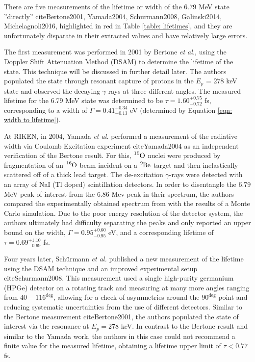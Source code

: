 There are five measurements of the lifetime or width of the 6.79 MeV state ''directly'' cite{Bertone2001, Yamada2004, Schurmann2008, Galinski2014, Michelagnoli2016}, highlighted in red in Table \ref{table: lifetimes}, and they are unfortunately disparate in their extracted values and have relatively large errors. 

The first measurement was performed in 2001 by Bertone \textit{et al.}, using the Doppler Shift Attenuation Method (DSAM) to determine the lifetime of the state. This technique will be discussed in further detail later. The authors populated the state through resonant capture of protons in the $E_{p}$ = 278 keV state and observed the decaying $\gamma$-rays at three different angles. The measured lifetime for the 6.79 MeV state was determined to be $\tau = 1.60^{+0.75}_{-0.72}$ fs, corresponding to a width of $\Gamma = 0.41^{+0.34}_{-0.13}$ eV (determined by Equation \ref{eqn: width to lifetime}). 

At RIKEN, in 2004, Yamada \textit{et al.} performed a measurement of the radiative width via Coulomb Excitation experiment cite{Yamada2004} as an independent verification of the Bertone result. For this, $\ce{^{15}O}$ nuclei were produced by fragmentation of an $\ce{^{16}O}$ beam incident on a $\ce{^{9}Be}$ target and then inelastically scattered off of a thick lead target. The de-excitation $\gamma$-rays were detected with an array of NaI (Tl doped) scintillation detectors. In order to disentangle the 6.79 MeV peak of interest from the 6.86 Mev peak in their spectrum, the authors compared the experimentally obtained spectrum from with the results of a Monte Carlo simulation. Due to the poor energy resolution of the detector system, the authors ultimately had difficulty separating the peaks and only reported an upper bound on the width, $\Gamma = 0.95^{+0.60}_{-0.95}$ eV, and a corresponding lifetime of $\tau = 0.69 ^{+1.10}_{-0.69}$ fs. 

Four years later, Sch{\"u}rmann \textit{et al.} published a new measurement of the lifetime using the DSAM technique and an improved experimental setup cite{Schurmann2008}. This measurement used a single high-purity germanium (HPGe) detector on a rotating track and measuring at many more angles ranging from $40 - 116^{\deg}$, allowing for a check of asymmetries around the $90^{\deg}$ point and reducing systematic uncertainties from the use of different detectors. Similar to the Bertone measurement cite{Bertone2001}, the authors populated the state of interest via the resonance at $E_{p} = 278$ keV. In contrast to the Bertone result and similar to the Yamada work, the authors in this case could not recommend a finite value for the measured lifetime, obtaining a lifetime upper limit of $\tau < 0.77$ fs. 

